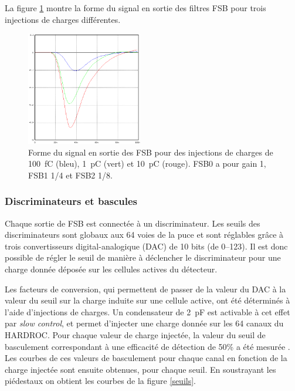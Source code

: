 La figure \ref{signal} montre la forme du signal en sortie des filtres FSB pour trois injections de charges différentes.
\begin{figure}[ht!]
	\centering
	\includegraphics[width=0.45\textwidth]{GLA/SIGNAL.png}
	\captionsetup{type=figure}\caption{Forme du signal en sortie des FSB pour des injections de charges de \SI{100}{\femto\coulomb} (bleu), \SI{1}{\pico\coulomb} (vert) et \SI{10}{\pico\coulomb} (rouge). FSB0 a pour gain \num{1}, FSB1 1/4 et FSB2 1/8.}
	\label{signal}
\end{figure}

\vspace*{-1.2cm}

\subsubsection{Discriminateurs et bascules}
Chaque sortie de FSB est connectée à un discriminateur. Les seuils des discriminateurs sont globaux aux \num{64} voies de la puce et sont réglables grâce à trois convertisseurs digital-analogique (DAC) de \num{10} bits (de \SIrange{0}{123}{}). Il est donc possible de régler le seuil de manière à déclencher le discriminateur pour une charge donnée déposée sur les cellules actives du détecteur.

Les facteurs de conversion, qui permettent de passer de la valeur du DAC à la valeur du seuil sur la charge induite sur une cellule active, ont été déterminés à l'aide d'injections de charges. Un condensateur de \SI{2}{\pico\farad} est activable à cet effet par \textit{slow control}, et permet d'injecter une charge donnée sur les \num{64} canaux du HARDROC. Pour chaque valeur de charge injectée, la valeur du seuil de basculement correspondant à une efficacité de détection de 50\% a été mesurée \cite{kieffer:tel-00751999}. Les courbes de ces valeurs de basculement pour chaque canal en fonction de la charge injectée sont ensuite obtenues, pour chaque seuil. En soustrayant les piédestaux on obtient les courbes de la figure \ref{seuils}.

